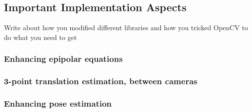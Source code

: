 \subsection{Important Implementation Aspects}
Write about how you modified different libraries and how you tricked OpenCV to do what you need to get
\subsubsection{Enhancing epipolar equations}
\subsubsection{3-point translation estimation, between cameras}
\subsubsection{Enhancing pose estimation}



